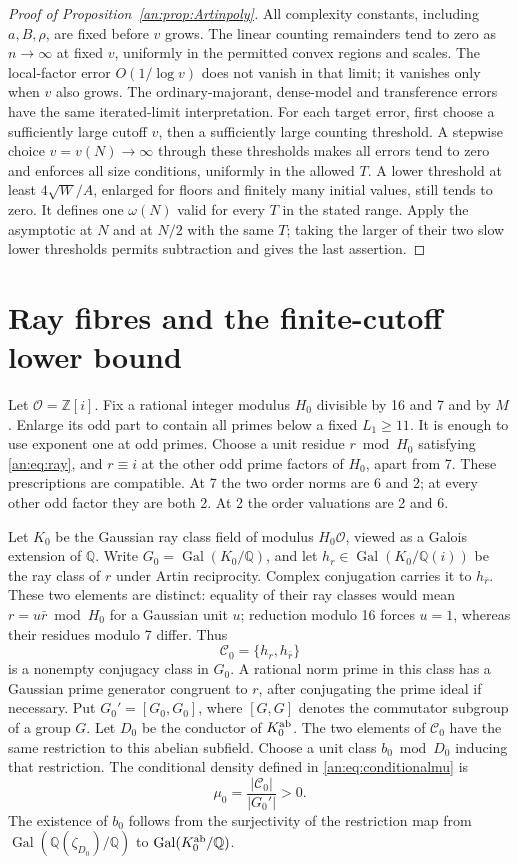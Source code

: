 \documentclass[11pt,reqno]{amsart}
\theoremstyle{definition}
\numberwithin{equation}{section}
\newcommand{\Gal}{\operatorname{Gal}}
\newcommand{\Q}{\mathbb Q}
\newcommand{\Z}{\mathbb Z}
\begin{document}
\begin{proof}[Proof of Proposition~\ref{an:prop:Artinpoly}]
All complexity constants, including $a,B,\rho$, are fixed before $v$ grows. The linear counting remainders tend to zero as $n\to\infty$ at fixed $v$, uniformly in the permitted convex regions and scales. The local-factor error $O(1/\log v)$ does not vanish in that limit; it vanishes only when $v$ also grows. The ordinary-majorant, dense-model and transference errors have the same iterated-limit interpretation. For each target error, first choose a sufficiently large cutoff $v$, then a sufficiently large counting threshold. A stepwise choice $v=v(N)\to\infty$ through these thresholds makes all errors tend to zero and enforces all size conditions, uniformly in the allowed $T$. A lower threshold at least $4\sqrt W/A$, enlarged for floors and finitely many initial values, still tends to zero. It defines one $\omega(N)$ valid for every $T$ in the stated range. Apply the asymptotic at $N$ and at $N/2$ with the same $T$; taking the larger of their two slow lower thresholds permits subtraction and gives the last assertion.
\end{proof}


\section{Ray fibres and the finite-cutoff lower bound}\label{an:sec:raylower}

Let $\mathcal O=\Z[i]$. Fix a rational integer modulus $H_0$ divisible by 16 and 7 and by $M$. Enlarge its odd part to contain all primes below a fixed $L_1\ge11$. It is enough to use exponent one at odd primes. Choose a unit residue $r\bmod H_0$ satisfying \eqref{an:eq:ray}, and $r\equiv i$ at the other odd prime factors of $H_0$, apart from 7. These prescriptions are compatible. At 7 the two order norms are 6 and 2; at every other odd factor they are both 2. At 2 the order valuations are 2 and 6.

Let $K_0$ be the Gaussian ray class field of modulus $H_0\mathcal O$, viewed as a Galois extension of $\Q$. Write $G_0=\Gal(K_0/\Q)$, and let $h_r\in\Gal(K_0/\Q(i))$ be the ray class of $r$ under Artin reciprocity. Complex conjugation carries it to $h_{\bar r}$. These two elements are distinct: equality of their ray classes would mean $r=u\bar r\bmod H_0$ for a Gaussian unit $u$; reduction modulo 16 forces $u=1$, whereas their residues modulo 7 differ. Thus
\[
 \mathcal C_0=\{h_r,h_{\bar r}\}
\]
is a nonempty conjugacy class in $G_0$. A rational norm prime in this class has a Gaussian prime generator congruent to $r$, after conjugating the prime ideal if necessary. Put $G_0'=[G_0,G_0]$, where $[G,G]$ denotes the commutator subgroup of a group $G$. Let $D_0$ be the conductor of $K_0^{\rm ab}$. The two elements of $\mathcal C_0$ have the same restriction to this abelian subfield. Choose a unit class $b_0\bmod D_0$ inducing that restriction. The conditional density defined in \eqref{an:eq:conditionalmu} is
\[
 \mu_0=\frac{|\mathcal C_0|}{|G_0'|}>0.
\]
The existence of $b_0$ follows from the surjectivity of the restriction map from $\Gal(\Q(\zeta_{D_0})/\Q)$ to $\Gal(K_0^{\rm ab}/\Q)$.
\end{document}
